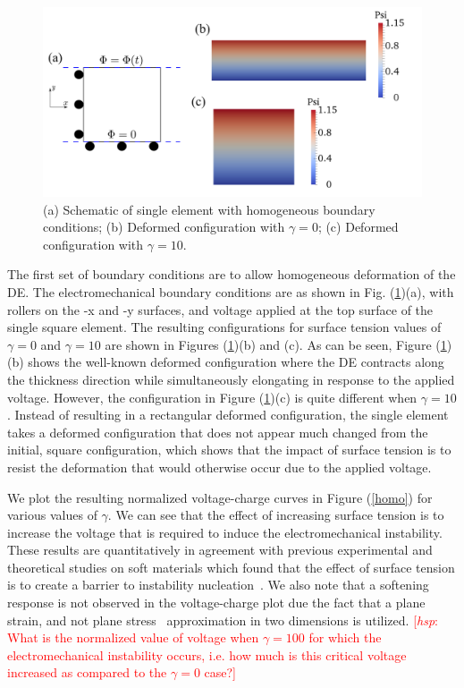 \documentclass[final,authoryear,3p,times,twocolumn]{elsarticle}
\newcommand{\hsp}[1]{\textcolor{red}{[\textit{hsp}: #1]}}
\begin{document}
\begin{figure} \begin{center} 
\includegraphics[scale=0.25]{pics/homo3.pdf}
\caption{(a) Schematic of single element with homogeneous boundary conditions; (b) Deformed configuration with $\gamma=0$; (c) Deformed configuration with $\gamma=10$.}
\label{homo3} \end{center} \end{figure}

The first set of boundary conditions are to allow homogeneous deformation of the DE. The electromechanical boundary conditions are as shown in Fig. (\ref{homo3})(a), with rollers on the -x and -y surfaces, and voltage applied at the top surface of the single square element.  The resulting configurations for surface tension values of $\gamma=0$ and $\gamma=10$ are shown in Figures (\ref{homo3})(b) and (c).  As can be seen, Figure (\ref{homo3})(b) shows the well-known deformed configuration where the DE contracts along the thickness direction while simultaneously elongating in response to the applied voltage.  However, the configuration in Figure (\ref{homo3})(c) is quite different when $\gamma=10$.  Instead of resulting in a rectangular deformed configuration, the single element takes a deformed configuration that does not appear much changed from the initial, square configuration, which shows that the impact of surface tension is to resist the deformation that would otherwise occur due to the applied voltage.

We plot the resulting normalized voltage-charge curves in Figure (\ref{homo}) for various values of $\gamma$.  We can see that the effect of increasing surface tension is to increase the voltage that is required to induce the electromechanical instability.  These results are quantitatively in agreement with previous experimental and theoretical studies on soft materials which found that the effect of surface tension is to create a barrier to instability nucleation~\citep{chenPRL2012,moraSM2011}.  We also note that a softening response is not observed in the voltage-charge plot due the fact that a plane strain, and not plane stress~\citep{zhouIJSS2008} approximation in two dimensions is utilized.  \hsp{What is the normalized value of voltage when $\gamma=100$ for which the electromechanical instability occurs, i.e. how much is this critical voltage increased as compared to the $\gamma=0$ case?}
\end{document}
